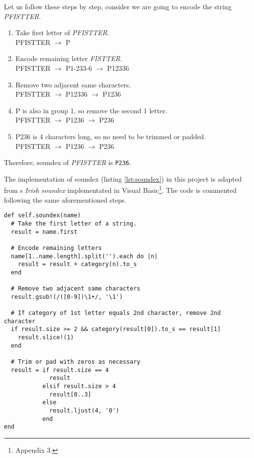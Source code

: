 Let us follow these steps by step, consider we are going to encode the string
\emph{PFISTTER}.

\begin{enumerate}
  \item Take first letter of \emph{PFISTTER}. \\
    PFISTTER $\rightarrow$ P
  \item Encode remaining letter \emph{FISTTER}. \\
    PFISTTER $\rightarrow$ P1-233-6 $\rightarrow$ P12336
  \item Remove two adjacent same characters. \\
    PFISTTER $\rightarrow$ P12336 $\rightarrow$ P1236
  \item P is also in group 1, so remove the second 1 letter. \\
    PFISTTER $\rightarrow$ P1236 $\rightarrow$ P236
  \item P236 is 4 characters long, so no need to be trimmed or padded. \\
    PFISTTER $\rightarrow$ P1236 $\rightarrow$ P236
\end{enumerate}

Therefore, soundex of \emph{PFISTTER} is \texttt{P236}.

The implementation of soundex (listing \ref{lst:soundex}) in this project is adapted from
\citeauthor{adamw}\textquotesingle s \emph{Irish soundex} implementated in Visual Basic\footnote{\cite{adamw} Appendix 3.}.
The code is commented following the same aforementioned steps.

\begin{minipage}{\linewidth}
\begin{lstlisting}[label={lst:soundex}, caption={Soundex implementation.}]
def self.soundex(name)
  # Take the first letter of a string.
  result = name.first

  # Encode remaining letters
  name[1..name.length].split('').each do |n|
    result = result + category(n).to_s
  end

  # Remove two adjacent same characters
  result.gsub!(/([0-9])\1+/, '\1')

  # If category of 1st letter equals 2nd character, remove 2nd character
  if result.size >= 2 && category(result[0]).to_s == result[1]
    result.slice!(1)
  end

  # Trim or pad with zeros as necessary
  result = if result.size == 4
             result
           elsif result.size > 4
             result[0..3]
           else
             result.ljust(4, '0')
           end
end
\end{lstlisting}
\end{minipage}

